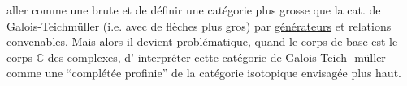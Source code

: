 aller comme une brute et de définir
une catégorie plus grosse que la cat.
de Galois-Teichmüller (i.e. avec
de flèches plus gros) par \uline{générateurs}
et relations convenables. Mais alors il
devient problématique, quand le corps de
base est le corps $\mathbb C$ des complexes, d'
interpréter cette catégorie de Galois-Teich-
müller comme une ``complétée profinie''
de la catégorie isotopique envisagée plus
haut.

